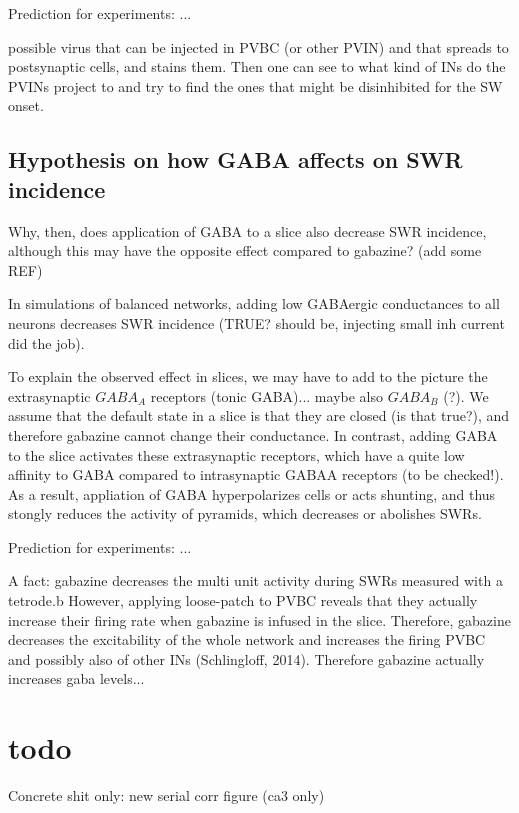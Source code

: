     Prediction for experiments: ...

    possible virus that can be injected in PVBC (or other PVIN) and that spreads to postsynaptic cells, and stains them. Then one can see to what kind of INs do the PVINs project to and try to find the ones that might be disinhibited for the SW onset.

  \subsection{Hypothesis on how GABA affects on SWR incidence} 

    Why, then, does application of GABA to a slice also decrease SWR
    incidence, although this may have the opposite effect compared to
    gabazine? (add some REF)

    In simulations of balanced networks, adding low GABAergic conductances
    to all neurons decreases SWR incidence (TRUE? should be, injecting small inh current did the job).

    To explain the observed effect in slices, we may have to add to the
    picture the extrasynaptic $GABA_A$ receptors (tonic GABA)... maybe also
    $GABA_B$ (?).  We assume that the default state in a slice is that they
    are closed (is that true?), and therefore gabazine cannot change their
    conductance. In contrast, adding GABA to the slice activates these
    extrasynaptic receptors, which have a quite low affinity to GABA
    compared to intrasynaptic GABAA receptors (to be checked!). As a
    result, appliation of GABA hyperpolarizes cells or acts shunting, and
    thus stongly reduces the activity of pyramids, which decreases or
    abolishes SWRs.

    Prediction for experiments: ...

    A fact: gabazine decreases the multi unit activity during SWRs measured with a tetrode.b
    However, applying loose-patch to PVBC reveals that they actually increase their firing rate
    when gabazine is infused in the slice. Therefore, gabazine decreases the excitability of the
    whole network and increases the firing PVBC and possibly also of other INs (Schlingloff, 2014).
    Therefore gabazine actually increases gaba levels...



\section{todo}


Concrete shit only:
new serial corr figure (ca3 only)

